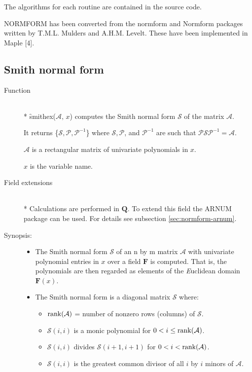 The algorithms for each routine are contained in the source code.

{\small NORMFORM} has been converted from the normform and Normform 
packages written by T.M.L. Mulders and A.H.M. Levelt. These have been 
implemented in Maple [4].


\subsection{Smith normal form}

\begin{description}
\item[Function]\mbox{}\\*
\f{smithex}($\mathcal{A},\, x$) computes the Smith normal form $\mathcal{ S}$
of the matrix $\mathcal{ A}$.

It returns \{$\mathcal{ S}, \mathcal{ P}, \mathcal{ P}^{-1}$\} where $\mathcal{ S}, 
\mathcal{ P}$, and $\mathcal{ P}^{-1}$ are such that $\mathcal{ P S P}^{-1} = 
\mathcal{ A}$.

$\mathcal{ A}$ is a rectangular matrix of univariate polynomials in $x$.

$x$ is the variable name.

\item[Field extensions]\mbox{}\\*
Calculations are performed in $\mathbf{Q}$. To extend this field the 
{\small ARNUM} package can be used. For details see subsection \ref{sec:normform-arnum}.

\item[Synopsis:]
\begin{itemize}
\item The Smith normal form $\mathcal{S}$ of an n by m matrix $\mathcal{A}$ 
with univariate polynomial entries in $x$ over a field $\mathbf{F}$ is 
computed. That is, the polynomials are then regarded as elements of the
{\it E}uclidean domain $\mathbf{F}(x)$.

\item The Smith normal form is a diagonal matrix $\mathcal{S}$ where:

  \begin{itemize}
  \item $\mathop{\mathrm{rank}}(\mathcal{A})$ = number of nonzero rows (columns) of 
        $\mathcal{S}$.
  \item $\mathcal{S}(i,i)$ is a monic polynomial for $0 < i \leq \mathop{\mathrm{rank}}(\mathcal{A})$.
  \item $\mathcal{S}(i,i)$ divides $\mathcal{S}(i+1,i+1)$ for $0 < i < \mathop{\mathrm{rank}}(\mathcal{A})$.
  \item $\mathcal{ S}(i,i)$ is the greatest common divisor of all $i$ by 
        $i$ minors of $\mathcal{A}$.
  \end{itemize}


\end{itemize}
\end{description}
